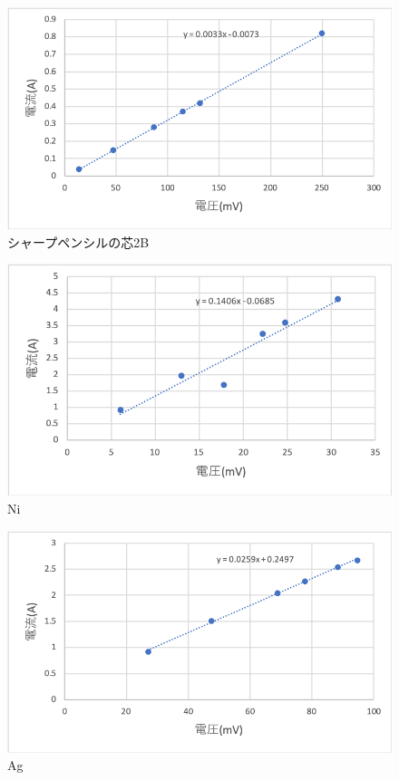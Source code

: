 \documentclass[11pt, a4paper,twocolumn]{jarticle}
\begin{document}
\begin{figure}[htbp]
 \begin{center}
  \includegraphics[width=0.8\linewidth]{fig19.png}
 \end{center}
 \caption{シャープペンシルの芯2B}
 \label{fig:19}
\end{figure}

\begin{figure}[htbp]
 \begin{center}
  \includegraphics[width=0.8\linewidth]{fig20.png}
 \end{center}
 \caption{Ni}
 \label{fig:20}
\end{figure}

\begin{figure}[htbp]
 \begin{center}
  \includegraphics[width=0.8\linewidth]{fig21.png}
 \end{center}
 \caption{Ag}
 \label{fig:21}
\end{figure}
\end{document}
